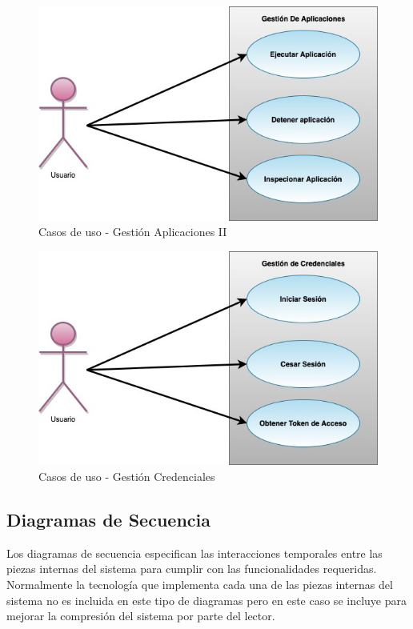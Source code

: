 \documentclass[a4paper,11pt]{book}
\begin{document}
\begin{figure}[H]
\centering
\includegraphics[scale=0.50]{imagenes/casosUso2.jpg}
\caption{ Casos de uso - Gestión Aplicaciones II~\cite{diagrama}  }
\end{figure}

\begin{figure}[H]
\centering
\includegraphics[scale=0.50]{imagenes/casosUso3.jpg}
\caption{ Casos de uso - Gestión Credenciales~\cite{diagrama}  }
\end{figure}

\subsection{Diagramas de Secuencia}
Los diagramas de secuencia especifican las interacciones temporales entre las piezas internas del sistema para cumplir con las funcionalidades requeridas. Normalmente la tecnología que implementa cada una de las piezas internas del sistema no es incluida en este tipo de diagramas pero en este caso se incluye para mejorar la compresión del sistema por parte del lector. 
\end{document}
